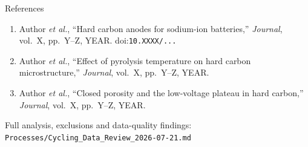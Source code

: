 \begin{frame}{References}
  \footnotesize
  \begin{enumerate}
    \item %
          Author \textit{et al.}, ``Hard carbon anodes for sodium-ion batteries,''
          \textit{Journal}, vol.~X, pp.~Y--Z, YEAR. doi:\texttt{10.XXXX/...}
    \item %
          Author \textit{et al.}, ``Effect of pyrolysis temperature on hard carbon
          microstructure,'' \textit{Journal}, vol.~X, pp.~Y--Z, YEAR.
    \item %
          Author \textit{et al.}, ``Closed porosity and the low-voltage plateau in
          hard carbon,'' \textit{Journal}, vol.~X, pp.~Y--Z, YEAR.
  \end{enumerate}
  \vspace{0.5em}
  {\scriptsize Full analysis, exclusions and data-quality findings:
  \texttt{Processes/Cycling\_Data\_Review\_2026-07-21.md}}
\end{frame}
